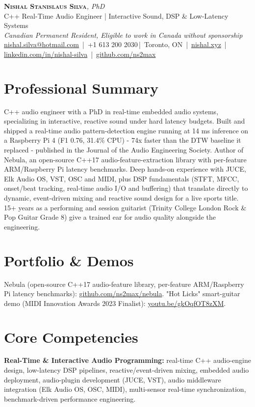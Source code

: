 \documentclass[11pt]{article}
\makeatletter
\newcommand{\cvName}{Nishal Stanislaus Silva}
\newcommand{\cvEmail}{nishal.silva@hotmail.com}
\newcommand{\cvPhone}{+1 613 200 2030}
\newcommand{\cvCity}{Toronto, ON}
\newcommand{\cvSite}{https://nishal.xyz}
\newcommand{\cvLinkedIn}{https://www.linkedin.com/in/nishal-silva}
\newcommand{\cvGitHub}{https://github.com/ns2max}
\newcommand{\cvStatus}{Canadian Permanent Resident, Eligible to work in Canada without sponsorship}
\newcommand{\cvTagline}{C++ Real-Time Audio Engineer | Interactive Sound, DSP \& Low-Latency Systems}
\makeatother
\begin{document}
\pagestyle{empty}
\begin{center}
    {\LARGE \scshape \textbf{\cvName}}{\large \textit{, PhD}}\\[1pt]
    {\small \cvTagline}\\[1pt]
    {\footnotesize\textit{\cvStatus}}\\[1pt]
    {\small
    \href{mailto:\cvEmail}{\cvEmail} \,|\, \cvPhone \,|\, \cvCity
    \,|\, \href{\cvSite}{nishal.xyz} \,|\, \href{\cvLinkedIn}{linkedin.com/in/nishal-silva}
    \,|\, \href{\cvGitHub}{github.com/ns2max}}
\end{center}

\section*{Professional Summary}
C++ audio engineer with a PhD in real-time embedded audio systems, specializing in interactive, reactive sound under hard latency budgets. Built and shipped a real-time audio pattern-detection engine running at 14 ms inference on a Raspberry Pi 4 (F1 0.76, 31.4\% CPU) - 74x faster than the DTW baseline it replaced - published in the Journal of the Audio Engineering Society. Author of Nebula, an open-source C++17 audio-feature-extraction library with per-feature ARM/Raspberry Pi latency benchmarks. Deep hands-on experience with JUCE, Elk Audio OS, VST, OSC and MIDI, plus DSP fundamentals (STFT, MFCC, onset/beat tracking, real-time audio I/O and buffering) that translate directly to dynamic, event-driven mixing and reactive sound design for a live sports title. 15+ years as a performing and session guitarist (Trinity College London Rock \& Pop Guitar Grade 8) give a trained ear for audio quality alongside the engineering.

\section*{Portfolio \& Demos}
Nebula (open-source C++17 audio-feature library, per-feature ARM/Raspberry Pi latency benchmarks): \href{https://github.com/ns2max/nebula}{github.com/ns2max/nebula}. "Hot Licks" smart-guitar demo (MIDI Innovation Awards 2023 Finalist): \href{https://youtu.be/gkOqfOT8zXM}{youtu.be/gkOqfOT8zXM}.

\section*{Core Competencies}
\textbf{Real-Time \& Interactive Audio Programming:} real-time C++ audio-engine design, low-latency DSP pipelines, reactive/event-driven mixing, embedded audio deployment, audio-plugin development (JUCE, VST), audio middleware integration (Elk Audio OS, OSC, MIDI), multi-sensor real-time synchronization, benchmark-driven performance engineering.
\end{document}
